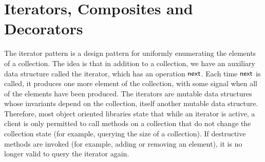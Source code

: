 \documentclass[preprint,natbib]{sigplanconf}
\begin{document}
% 
% 

\section{Iterators, Composites and Decorators}
The iterator pattern is a design pattern for uniformly enumerating the
elements of a collection. The idea is that in addition to a
collection, we have an auxiliary data structure called the iterator,
which has an operation $\mbox{\textsf{{next}}}$. Each time $\mbox{\textsf{{next}}}$ is
called, it produces one more element of the collection, with some
signal when all of the elements have been produced. The iterators are
mutable data structures whose invariants depend on the collection,
itself another mutable data structure. Therefore, most object oriented
libraries state that while an iterator is active, a client is only
permitted to call methods on a collection that do not change the
collection state (for example, querying the size of a collection). If
destructive methods are invoked (for example, adding or removing an
element), it is no longer valid to query the iterator again.
\end{document}
